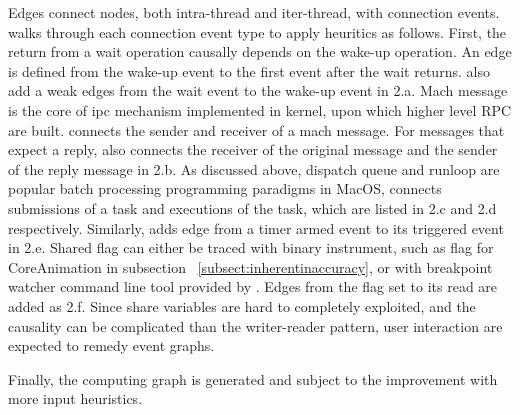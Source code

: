 Edges connect nodes, both intra-thread and iter-thread, with connection events.
\xxx walks through each connection event type to apply heuritics as follows.
First, the return from a wait operation causally depends on the wake-up
operation. An edge is defined from the wake-up event to the first event after
the wait returns. \xxx also add a weak edges from the wait event to the wake-up
event in 2.a. Mach message is the core of ipc mechanism implemented in kernel,
upon which higher level RPC are built. \xxx connects the sender and receiver
of a mach message. For messages that expect a reply, \xxx also connects the
receiver of the original message and the sender of the reply message in 2.b.
As discussed above, dispatch queue and runloop are popular batch processing
programming paradigms in MacOS, \xxx connects submissions of a task and
executions of the task, which are listed in 2.c and 2.d respectively. Similarly,
\xxx adds edge from a timer armed event to its triggered event in 2.e. Shared
flag can either be traced with binary instrument, such as 
flag for CoreAnimation in subsection ~\ref{subsect:inherentinaccuracy}, or with
breakpoint watcher command line tool provided by \xxx. Edges from the flag set
to its read are added as 2.f. Since share variables are hard to completely
exploited, and the causality can be complicated than the writer-reader pattern,
user interaction are expected to remedy event graphs.

Finally, the computing graph is generated and subject to the improvement with
more input heuristics.


